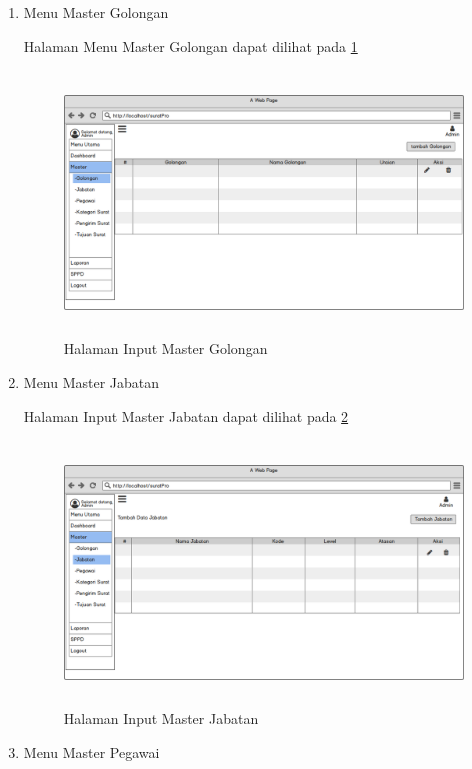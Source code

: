 \begin{enumerate}
\begin{enumerate}
		\item Menu Master Golongan
		
		Halaman Menu Master Golongan dapat dilihat pada \pic\ref{HalamanInputMasterGolongan}
		
		\begin{figure}
			\centering
			\includegraphics [height= 7cm, width=11cm]{konten/gambar/WireFrameSistemSurat/Admin/Mastergolongan.png}
			\caption{Halaman Input Master Golongan}
			\label{HalamanInputMasterGolongan}
		\end{figure}
		
		\item Menu Master Jabatan
		
		Halaman Input Master Jabatan dapat dilihat pada \pic\ref{HalamanInputMasterJabatan}
		
		\begin{figure}
			\centering
			\includegraphics [height= 7cm, width=11cm]{konten/gambar/WireFrameSistemSurat/Admin/MasterJabatan.png}
			\caption{Halaman Input Master Jabatan}
			\label{HalamanInputMasterJabatan}
		\end{figure}
		
		\item Menu Master Pegawai
		

\end{enumerate}
\end{enumerate}
